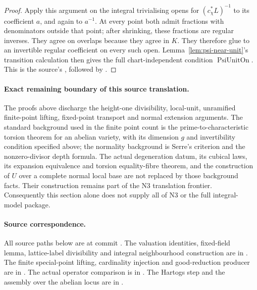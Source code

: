 \begin{proof}
Apply this argument on the integral trivialising opens for
\((c_\chi^*L)^{-1}\) to its coefficient \(a\), and again to \(a^{-1}\).
At every point both admit fractions with denominators outside that
point; after shrinking, these fractions are regular inverses.
They agree on overlaps because they agree in \(K\).
They therefore glue to an invertible regular coefficient on every
such open.  Lemma~\ref{lem:psi-near-unit}'s transition calculation
then gives the full chart-independent condition
\(\operatorname{PsiUnitOn}\).
This is the source's , followed by
.
\end{proof}

\paragraph{Exact remaining boundary of this source translation.}
The proofs above discharge the height-one divisibility, local-unit,
unramified finite-point lifting, fixed-point transport and normal
extension arguments.  The standard background used in the finite
point count is the prime-to-characteristic torsion theorem for an
abelian variety, with its dimension \(g\) and invertibility condition
specified above; the normality background is Serre's criterion and
the nonzero-divisor depth formula.
The actual degeneration datum, its cubical laws, its expansion
equivalence and torsion equality-fibre theorem, and the construction
of \(U\) over a complete normal local base are not replaced by those
background facts.  Their construction remains part of the N3
translation frontier.  Consequently this section alone does not
supply all of N3 or the full integral-model package.

\paragraph{Source correspondence.}
All source paths below are at commit
.
The valuation identities, fixed-field lemma, lattice-label
divisibility and integral neighbourhood construction are in
.
The finite special-point lifting, cardinality injection and
good-reduction producer are in
.
The actual operator comparison is in
.
The Hartogs step and the assembly over the abelian locus are in
.
